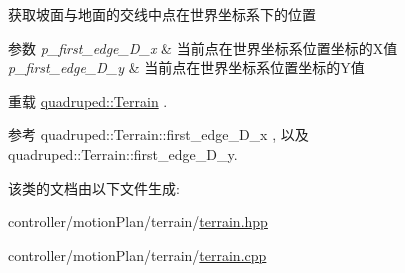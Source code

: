 获取坡面与地面的交线中点在世界坐标系下的位置 


\begin{DoxyParams}{参数}
{\em p\+\_\+first\+\_\+edge\+\_\+\+D\+\_\+x} & 当前点在世界坐标系位置坐标的\+X值 \\
\hline
{\em p\+\_\+first\+\_\+edge\+\_\+\+D\+\_\+y} & 当前点在世界坐标系位置坐标的\+Y值 \\
\hline
\end{DoxyParams}


重载 \hyperlink{classquadruped_1_1Terrain}{quadruped\+::\+Terrain} .



参考 quadruped\+::\+Terrain\+::first\+\_\+edge\+\_\+\+D\+\_\+x , 以及 quadruped\+::\+Terrain\+::first\+\_\+edge\+\_\+\+D\+\_\+y.



该类的文档由以下文件生成\+:\begin{DoxyCompactItemize}
\item 
controller/motion\+Plan/terrain/\hyperlink{terrain_8hpp}{terrain.\+hpp}\item 
controller/motion\+Plan/terrain/\hyperlink{terrain_8cpp}{terrain.\+cpp}\end{DoxyCompactItemize}
